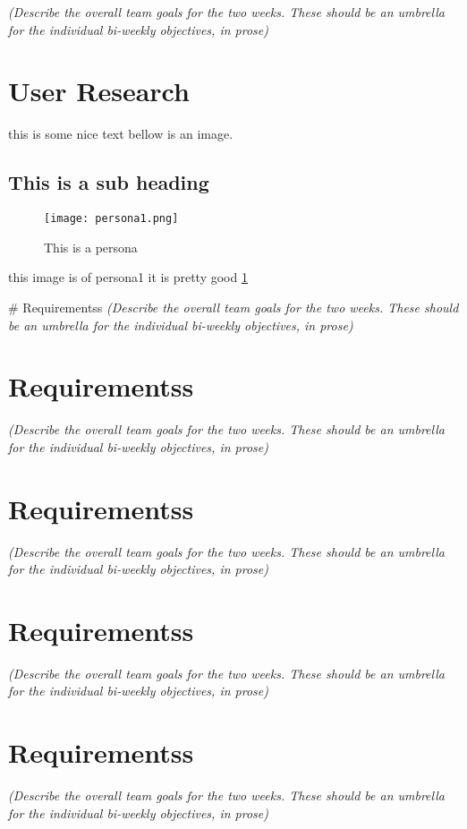 \emph{(Describe the overall team goals for the two weeks. These should
be an umbrella for the individual bi-weekly objectives, in prose)}

\hypertarget{user-research}{%
\section{User Research}\label{user-research}}

this is some nice text bellow is an image.
\cite{blanchard2003macroeconomic}

\hypertarget{this-is-a-sub-heading}{%
\subsection{This is a sub heading}\label{this-is-a-sub-heading}}

\begin{figure}[H]
      \centering
      \texttt{[image: persona1.png]}
      \caption{This is a persona}
      \label{persona1}
 \end{figure}

this image \cite{rumelt2012good} is of persona1 it is pretty good
\ref{persona1}

\newpage \# Requirementss \emph{(Describe the overall team goals for the
two weeks. These should be an umbrella for the individual bi-weekly
objectives, in prose)}

\hypertarget{requirementss-2}{%
\section{Requirementss}\label{requirementss-2}}

\emph{(Describe the overall team goals for the two weeks. These should
be an umbrella for the individual bi-weekly objectives, in prose)}

\hypertarget{requirementss-3}{%
\section{Requirementss}\label{requirementss-3}}

\emph{(Describe the overall team goals for the two weeks. These should
be an umbrella for the individual bi-weekly objectives, in prose)}

\hypertarget{requirementss-4}{%
\section{Requirementss}\label{requirementss-4}}

\emph{(Describe the overall team goals for the two weeks. These should
be an umbrella for the individual bi-weekly objectives, in prose)}

\hypertarget{requirementss-5}{%
\section{Requirementss}\label{requirementss-5}}

\emph{(Describe the overall team goals for the two weeks. These should
be an umbrella for the individual bi-weekly objectives, in prose)}
